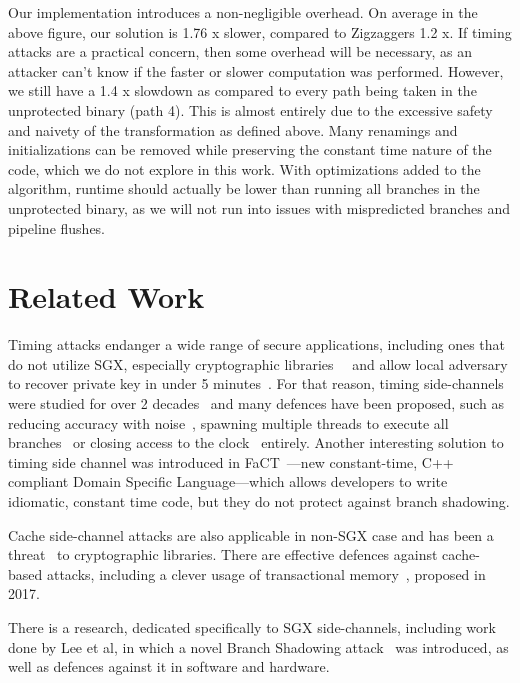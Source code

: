 \documentclass[sigplan, review]{acmart}
\begin{document}
Our implementation introduces a non-negligible overhead. On average in the above figure, our solution is 1.76 x slower, compared to Zigzaggers 1.2 x. If timing attacks are a practical concern, then some overhead will be necessary, as an attacker can't know if the faster or slower computation was performed. However, we still have a 1.4 x slowdown as compared to every path being taken in the unprotected binary (path 4). This is almost entirely due to the excessive safety and naivety of the transformation as defined above. Many renamings and initializations can be removed while preserving the constant time nature of the code, which we do not explore in this work. With optimizations added to the algorithm, runtime should actually be lower than running all branches in the unprotected binary, as we will not run into issues with mispredicted branches and pipeline flushes.

\section{Related Work}
Timing attacks endanger a wide range of secure applications, including ones that do not utilize SGX, especially cryptographic libraries~\cite{arnaud2013timing}~\cite{garcia2016constant} and allow local adversary to recover private key in under 5 minutes~\cite{schwarz2017malware}. For that reason, timing side-channels were studied for over 2 decades~\cite{kocher1996timing} and many defences have been proposed, such as reducing accuracy with noise~\cite{hu1992reducing}, spawning multiple threads to execute all branches~\cite{devriese2010noninterference} or closing access to the clock~\cite{percival2005cache} entirely. Another interesting solution to timing side channel was introduced in FaCT~\cite{cauligi2017fact}---new constant-time, C++ compliant Domain Specific Language---which allows developers to write idiomatic, constant time code, but they do not protect against branch shadowing.

Cache side-channel attacks are also applicable in non-SGX case and has been a threat~\cite{osvik2006cache} to cryptographic libraries. There are effective defences against cache-based attacks, including a clever usage of transactional memory~\cite{gruss2017strong}, proposed in 2017.

There is a research, dedicated specifically to SGX side-channels, including work done by Lee et al, in which a novel Branch Shadowing attack~\cite{lee2016inferring} was introduced, as well as defences against it in software and hardware.
\end{document}
